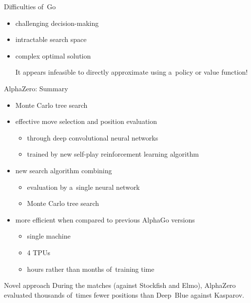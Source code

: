 \documentclass{beamer}
\begin{document}
  {
    \begin{frame}{Difficulties of~Go}
      \begin{itemize}[<+- | alert@+>]
        \item challenging decision-making
        \item intractable search space
        \item complex optimal solution

          {\tiny It appears infeasible to directly approximate using a~policy or value function!}
      \end{itemize}
    \end{frame}

    \begin{frame}{AlphaZero: Summary}
      \begin{itemize}[<+- | alert@+>]
        \item Monte Carlo tree search
        \item effective move selection and position evaluation 
          \begin{itemize}[<+- | alert@+>]
            \item through deep convolutional neural networks
            \item trained by new self-play reinforcement learning algorithm
          \end{itemize}
        \item new search algorithm combining
          \begin{itemize}[<+- | alert@+>]
            \item evaluation by a~single neural network
            \item Monte Carlo tree search
          \end{itemize}
        \item more efficient when compared to previous AlphaGo versions
          \begin{itemize}[<+- | alert@+>]
            \item single machine
            \item 4 TPUs
            \item hours rather than months of~training time
          \end{itemize}
      \end{itemize}
    \end{frame}

    \begin{frame}{Novel approach}
      \pause
      During the matches (against Stockfish and Elmo), AlphaZero evaluated \alert{thousands of~times fewer} positions than Deep~Blue against Kasparov.
      \pause


\end{frame}}
\end{document}
